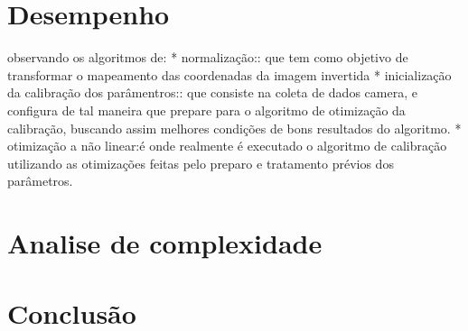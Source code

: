 \documentclass[portuguese]{sbrt}
\begin{document}
\section{Desempenho} 
\label{sec:desempenho}
observando os algoritmos de:
* normalização:: que tem como objetivo de transformar o mapeamento das coordenadas da imagem invertida
* inicialização da calibração dos parâmentros:: que consiste na coleta de dados camera, e configura de tal maneira que prepare para o algoritmo de otimização da calibração, buscando assim melhores condições de bons resultados do algoritmo.
* otimização a não linear:é onde realmente é executado o algoritmo de calibração utilizando as otimizações feitas pelo preparo e tratamento prévios dos parâmetros.

\section{Analise de complexidade}
\label{sec:analise_complexidade}

\section{Conclusão}
\label{sec:conclusao}


 

\end{document}
